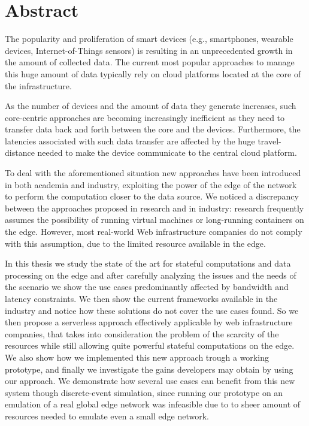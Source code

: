 \chapter*{Abstract}

The popularity and proliferation of smart devices (e.g., smartphones, wearable devices, Internet-of-Things sensors) is resulting in an unprecedented growth in the amount of collected data. The current most popular approaches to manage this huge amount of data typically rely on cloud platforms located at the core of the infrastructure.

As the number of devices and the amount of data they generate increases, such core-centric approaches are becoming increasingly inefficient as they need to transfer data back and forth between the core and the devices. Furthermore, the latencies associated with such data transfer are affected by the huge travel-distance needed to make the device communicate to the central cloud platform.

To deal with the aforementioned situation new approaches have been introduced in both academia and industry, exploiting the power of the edge of the network to perform the computation closer to the data source. We noticed a discrepancy between the approaches proposed in research and in industry: research frequently assumes the possibility of running virtual machines or long-running containers on the edge. However, most real-world Web infrastructure companies do not comply with this assumption, due to the limited resource available in the edge.

In this thesis we study the state of the art for stateful computations and data processing on the edge and after carefully analyzing the issues and the needs of the scenario we show the use cases predominantly affected by bandwidth and latency constraints. We then show the current frameworks available in the industry and notice how these solutions do not cover the use cases found. So we then propose a serverless approach effectively applicable by web infrastructure companies, that takes into consideration the problem of the scarcity of the resources while still allowing quite powerful stateful computations on the edge. We also show how we implemented this new approach trough a working prototype, and finally we investigate the gains developers may obtain by using our approach. We demonstrate how several use cases can benefit from this new system though discrete-event simulation, since running our prototype on an emulation of a real global edge network was infeasible due to to sheer amount of resources needed to emulate even a small edge network.

